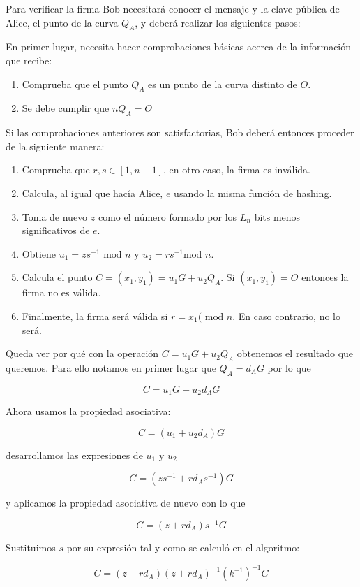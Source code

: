 \documentclass{article}
\begin{document}
Para verificar la firma Bob necesitará conocer el mensaje y la clave
pública de Alice, el punto de la curva $Q_A$, y deberá realizar los
siguientes pasos:

En primer lugar, necesita hacer comprobaciones básicas acerca de la
información que recibe:

\begin{enumerate}
\item Comprueba que el punto $Q_A$ es un punto de la curva distinto
de $O$.
\item Se debe cumplir que $nQ_A=O$
\end{enumerate}

Si las comprobaciones anteriores son satisfactorias, Bob deberá
entonces proceder de la siguiente manera:

\begin{enumerate}
\item Comprueba que $r,s\in[1, n-1]$, en otro caso, la firma es
inválida.
\item Calcula, al igual que hacía Alice, $e$ usando la misma
función de hashing.
\item Toma de nuevo $z$ como el número formado por los $L_n$ bits menos significativos de $e$.
\item Obtiene $u_1 = zs^{-1} \text{ mod } n$ y $u_2 = rs^{-1} \text{
mod } n$.
\item Calcula el punto $C = (x_1,y_1)=u_1G+u_2Q_A$. Si $(x_1,
y_1)=O$ entonces la firma no es válida.
\item Finalmente, la firma será válida si $r= x_1 ( \text{ mod }
n$. En caso contrario, no lo será.
\end{enumerate}

Queda ver por qué con la operación $C=u_1G+u_2Q_A$ obtenemos el
resultado que queremos. Para ello notamos en primer lugar que
$Q_A=d_AG$ por lo que

\[ C=u_1G+u_2d_AG
\]

Ahora usamos la propiedad asociativa:

\[ C = (u_1+u_2d_A)G
\]

desarrollamos las expresiones de $u_1$ y $u_2$

\[ C = (zs^{-1}+rd_As^{-1})G
\]

y aplicamos la propiedad asociativa de nuevo con lo que

\[ C = (z+rd_A)s^{-1}G
\]

Sustituimos $s$ por su expresión tal y como se calculó en el
algoritmo:

\[ C = (z+rd_A)(z+rd_A)^{-1}(k^{-1})^{-1}G
\]
\end{document}
